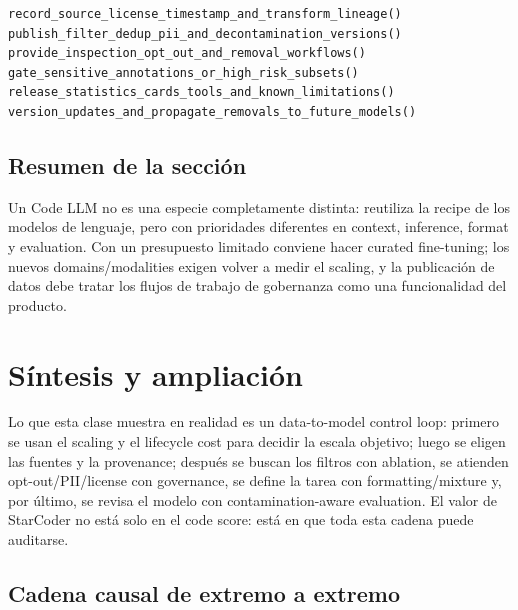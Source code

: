\documentclass[a4paper]{article}
\begin{document}
\begin{lstlisting}[caption={Checklist previa a la publicación de un conjunto de datos de entrenamiento grande}]
record_source_license_timestamp_and_transform_lineage()
publish_filter_dedup_pii_and_decontamination_versions()
provide_inspection_opt_out_and_removal_workflows()
gate_sensitive_annotations_or_high_risk_subsets()
release_statistics_cards_tools_and_known_limitations()
version_updates_and_propagate_removals_to_future_models()
\end{lstlisting}


\subsection{Resumen de la sección}

Un Code LLM no es una especie completamente distinta: reutiliza la recipe de los modelos de lenguaje, pero con prioridades diferentes en context, inference, format y evaluation. Con un presupuesto limitado conviene hacer curated fine-tuning; los nuevos domains/modalities exigen volver a medir el scaling, y la publicación de datos debe tratar los flujos de trabajo de gobernanza como una funcionalidad del producto.
\section{Síntesis y ampliación}

Lo que esta clase muestra en realidad es un data-to-model control loop: primero se usan el scaling y el lifecycle cost para decidir la escala objetivo; luego se eligen las fuentes y la provenance; después se buscan los filtros con ablation, se atienden opt-out/PII/license con governance, se define la tarea con formatting/mixture y, por último, se revisa el modelo con contamination-aware evaluation. El valor de StarCoder no está solo en el code score: está en que toda esta cadena puede auditarse.

\subsection{Cadena causal de extremo a extremo}
\end{document}
